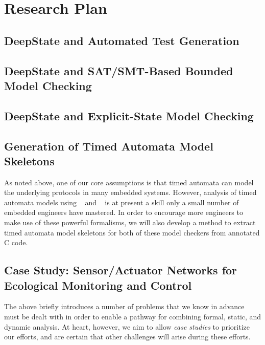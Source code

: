 \section{Research Plan}

%

\subsection{DeepState and Automated Test Generation}
\label{sec:framac2deepstate}


\subsection{DeepState and SAT/SMT-Based Bounded Model Checking}


\subsection{DeepState and Explicit-State Model Checking}


\subsection{Generation of Timed Automata Model Skeletons}
As noted above, one of our core assumptions is that timed automata can
model the underlying protocols in many embedded systems.  However,
analysis of timed automata models using \uppaal~\cite{uppaal} and
\prism~\cite{KNP2011:CAV} is at present a skill only a small number of
embedded engineers have mastered.  In order to encourage more
engineers to make use of these powerful formalisms, we will also
develop a method to extract timed automata model skeletons for both of these
model checkers from annotated C code.  

\subsection{Case Study: Sensor/Actuator Networks for Ecological Monitoring and Control}
\label{sec:case-study}

The above briefly introduces a number of problems that we know in advance must
be dealt with in order to enable a pathway for combining formal,
static, and dynamic analysis.    At heart, however, we aim to allow
\emph{case studies} to prioritize our efforts, and
are certain that other challenges will arise during these efforts.

